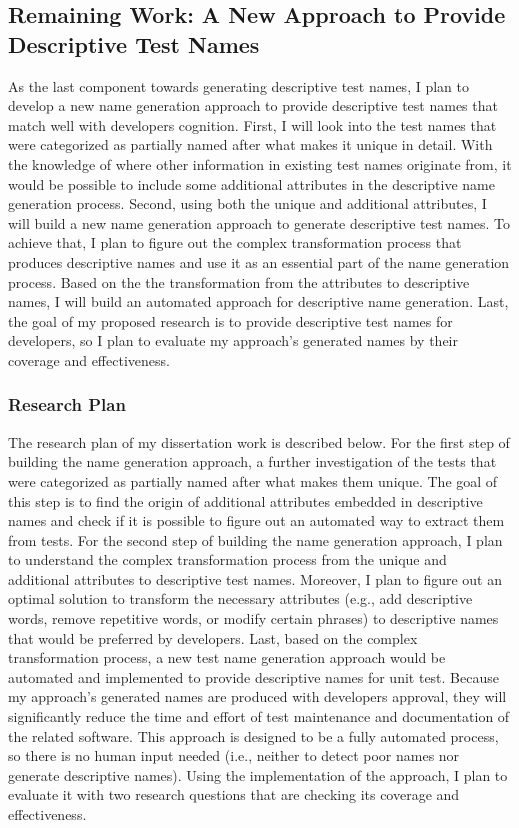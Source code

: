 \subsection{Remaining Work: A New Approach to Provide Descriptive Test Names}
\label{sec:remaining-work}

As the last component towards generating descriptive test names, I plan to develop a new name generation approach to provide descriptive test names that match well with developers cognition.
%
First, I will look into the test names that were categorized as partially named after what makes it unique in detail.
%
With the knowledge of where other information in existing test names originate from, it would be possible to include some additional attributes in the descriptive name generation process.
%
Second, using both the unique and additional attributes, I will build a new name generation approach to generate descriptive test names.
%
To achieve that, I plan to figure out the complex transformation process that produces descriptive names and use it as an essential part of the name generation process.
%
Based on the the transformation from the attributes to descriptive names, I will build an automated approach for descriptive name generation.
%
Last, the goal of my proposed research is to provide descriptive test names for developers, so I plan to evaluate my approach's generated names by their coverage and effectiveness.


\subsubsection{Research Plan}

The research plan of my dissertation work is described below.
%
For the first step of building the name generation approach, a further investigation of the tests that were categorized as partially named after what makes them unique.
%
The goal of this step is to find the origin of additional attributes embedded in descriptive names and check if it is possible to figure out an automated way to extract them from tests.
%
For the second step of building the name generation approach, I plan to understand the complex transformation process from the unique and additional attributes to descriptive test names.
%
Moreover, I plan to figure out an optimal solution to transform the necessary attributes (e.g., add descriptive words, remove repetitive words, or modify certain phrases) to descriptive names that would be preferred by developers.
%
Last, based on the complex transformation process, a new test name generation approach would be automated and implemented to provide descriptive names for unit test.
%
Because my approach's generated names are produced with developers approval, they will significantly reduce the time and effort of test maintenance and documentation of the related software.
%
This approach is designed to be a fully automated process, so there is no human input needed (i.e., neither to detect poor names nor generate descriptive names).
%
Using the implementation of the approach, I plan to evaluate it with two research questions that are checking its coverage and effectiveness.


